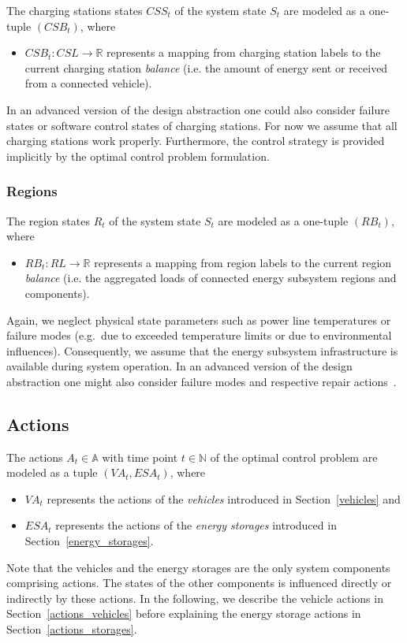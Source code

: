 The charging stations states $CSS_t$ of the system state $S_t$ are modeled as a one-tuple $(CSB_t)$, where
\begin{itemize}
	\item $CSB_t: CSL \rightarrow \mathbb{R}$ represents a mapping from charging station labels to the current charging station \textit{balance} (i.e. the amount of energy sent or received from a connected vehicle).
\end{itemize}
In an advanced version of the design abstraction one could also consider failure states or software control states of charging stations. For now we assume that all charging stations work properly. Furthermore, the control strategy is provided implicitly by the optimal control problem formulation.

\subsubsection{Regions}
\label{states_regions}

The region states $R_t$ of the system state $S_t$ are modeled as a one-tuple $(RB_t)$, where
\begin{itemize}
	\item $RB_t: RL \rightarrow \mathbb{R}$ represents a mapping from region labels to the current region \textit{balance} (i.e. the aggregated loads of connected energy subsystem regions and components).
\end{itemize}
Again, we neglect physical state parameters such as power line temperatures or failure modes (e.g.\ due to exceeded temperature limits or due to environmental influences). Consequently, we assume that the energy subsystem infrastructure is available during system operation. In an advanced version of the design abstraction one might also consider failure modes and respective repair actions~\cite{?}.

\subsection{Actions}
\label{actions}

The actions $A_t \in \mathbb{A}$ with time point $t \in \mathbb{N}$ of the optimal control problem are modeled as a tuple $(VA_t, ESA_t)$, where
\begin{itemize}
	\item $VA_t$ represents the actions of the \textit{vehicles} introduced in Section~\ref{vehicles} and
	\item $ESA_t$ represents the actions of the \textit{energy storages} introduced in Section~\ref{energy_storages}.
\end{itemize}
Note that the vehicles and the energy storages are the only system components comprising actions. The states of the other components is influenced directly or indirectly by these actions. In the following, we describe the vehicle actions in Section~\ref{actions_vehicles} before explaining the energy storage actions in Section~\ref{actions_storages}.

